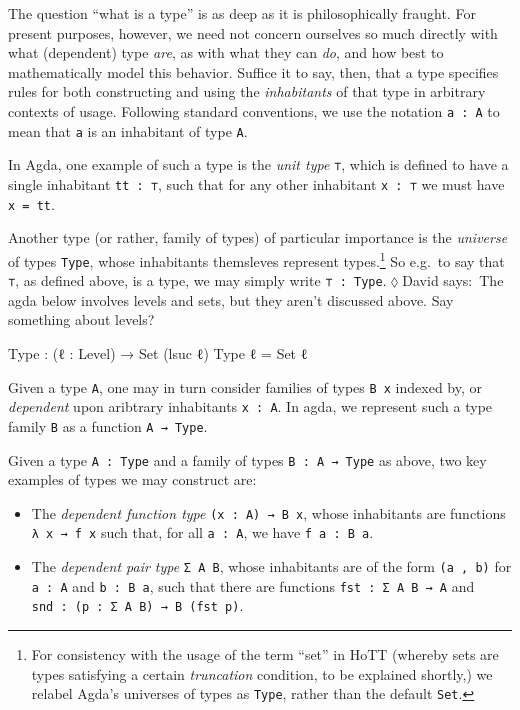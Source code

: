 \documentclass[
  11pt,
  oneside,
  article]{memoir}
\newenvironment{Shaded}{}{}
\newcommand{\DataTypeTok}[1]{\textcolor[rgb]{0.56,0.13,0.00}{#1}}
\newcommand{\NormalTok}[1]{#1}
\newcommand{\OtherTok}[1]{\textcolor[rgb]{0.00,0.44,0.13}{#1}}
\providecommand{\tightlist}{%
  \setlength{\itemsep}{0pt}\setlength{\parskip}{0pt}}
\theoremstyle{definition}
\theoremstyle{plain}
\newcommand{\0}{\textsf{0}}
\newcommand{\1}{\tn{\textsf{1}}}
\newcommand{\dnote}[1]{{\quad \color{blue}$\lozenge$\;David says:}~#1\;{\color{blue}$\lozenge$}\quad}
\begin{document}
The question ``what is a type'' is as deep as it is philosophically
fraught. For present purposes, however, we need not concern ourselves so
much directly with what (dependent) type \emph{are}, as with what they
can \emph{do}, and how best to mathematically model this behavior.
Suffice it to say, then, that a type specifies rules for both
constructing and using the \emph{inhabitants} of that type in arbitrary
contexts of usage. Following standard conventions, we use the notation
\texttt{a\ :\ A} to mean that \texttt{a} is an inhabitant of type
\texttt{A}.

In Agda, one example of such a type is the \emph{unit type} \texttt{⊤},
which is defined to have a single inhabitant \texttt{tt\ :\ ⊤}, such
that for any other inhabitant \texttt{x\ :\ ⊤} we must have
\texttt{x\ =\ tt}.

Another type (or rather, family of types) of particular importance is
the \emph{universe} of types \texttt{Type}, whose inhabitants themsleves
represent types.\footnote{For consistency with the usage of the term
  ``set'' in HoTT (whereby sets are types satisfying a certain
  \emph{truncation} condition, to be explained shortly,) we relabel
  Agda's universes of types as \texttt{Type}, rather than the default
  \texttt{Set}.} So e.g.~to say that \texttt{⊤}, as defined above, is a
type, we may simply write \texttt{⊤\ :\ Type}.\dnote{The agda below involves levels and sets, but they aren't discussed above. Say something about levels?}

\begin{Shaded}
\begin{Highlighting}[]
\NormalTok{Type }\OtherTok{:} \OtherTok{(}\NormalTok{ℓ }\OtherTok{:}\NormalTok{ Level}\OtherTok{)} \OtherTok{→} \DataTypeTok{Set} \OtherTok{(}\NormalTok{lsuc ℓ}\OtherTok{)}
\NormalTok{Type ℓ }\OtherTok{=} \DataTypeTok{Set}\NormalTok{ ℓ}
\end{Highlighting}
\end{Shaded}

Given a type \texttt{A}, one may in turn consider families of types
\texttt{B\ x} indexed by, or \emph{dependent} upon aribtrary inhabitants
\texttt{x\ :\ A}. In agda, we represent such a type family \texttt{B} as
a function \texttt{A\ →\ Type}.

Given a type \texttt{A\ :\ Type} and a family of types
\texttt{B\ :\ A\ →\ Type} as above, two key examples of types we may
construct are:

\begin{itemize}
\tightlist
\item
  The \emph{dependent function type} \texttt{(x\ :\ A)\ →\ B\ x}, whose
  inhabitants are functions \texttt{λ\ x\ →\ f\ x} such that, for all
  \texttt{a\ :\ A}, we have \texttt{f\ a\ :\ B\ a}.
\item
  The \emph{dependent pair type} \texttt{Σ\ A\ B}, whose inhabitants are
  of the form \texttt{(a\ ,\ b)} for \texttt{a\ :\ A} and
  \texttt{b\ :\ B\ a}, such that there are functions
  \texttt{fst\ :\ Σ\ A\ B\ →\ A} and
  \texttt{snd\ :\ (p\ :\ Σ\ A\ B)\ →\ B\ (fst\ p)}.
\end{itemize}
\end{document}
